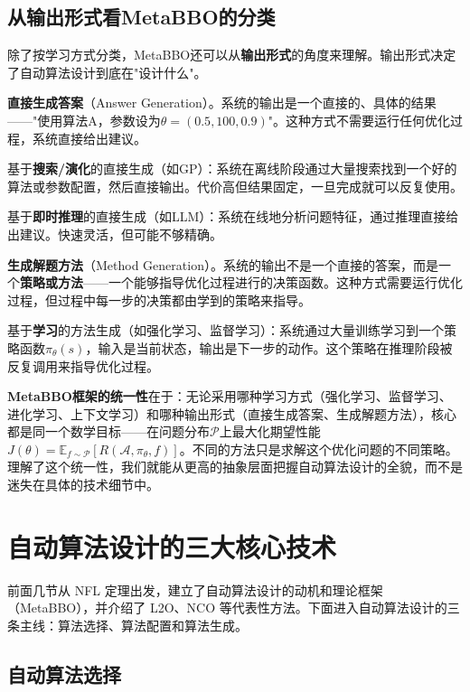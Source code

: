 \documentclass[lang=cn,zihao=-4,a4paper,fontset=windows]{beautybook}
\begin{document}
\subsection{从输出形式看MetaBBO的分类}

除了按学习方式分类，MetaBBO还可以从\textbf{输出形式}的角度来理解。输出形式决定了自动算法设计到底在"设计什么"。

\textbf{直接生成答案}（Answer Generation）。系统的输出是一个直接的、具体的结果——"使用算法A，参数设为$\theta = (0.5, 100, 0.9)$"。这种方式不需要运行任何优化过程，系统直接给出建议。

基于\textbf{搜索/演化}的直接生成（如GP）：系统在离线阶段通过大量搜索找到一个好的算法或参数配置，然后直接输出。代价高但结果固定，一旦完成就可以反复使用。

基于\textbf{即时推理}的直接生成（如LLM）：系统在线地分析问题特征，通过推理直接给出建议。快速灵活，但可能不够精确。

\textbf{生成解题方法}（Method Generation）。系统的输出不是一个直接的答案，而是一个\textbf{策略或方法}——一个能够指导优化过程进行的决策函数。这种方式需要运行优化过程，但过程中每一步的决策都由学到的策略来指导。

基于\textbf{学习}的方法生成（如强化学习、监督学习）：系统通过大量训练学习到一个策略函数$\pi_\theta(s)$，输入是当前状态，输出是下一步的动作。这个策略在推理阶段被反复调用来指导优化过程。

\begin{fancybox}
\textbf{MetaBBO框架的统一性}在于：无论采用哪种学习方式（强化学习、监督学习、进化学习、上下文学习）和哪种输出形式（直接生成答案、生成解题方法），核心都是同一个数学目标——在问题分布$\mathcal{P}$上最大化期望性能$J(\theta) = \mathbb{E}_{f \sim \mathcal{P}}[R(\mathcal{A}, \pi_\theta, f)]$。不同的方法只是求解这个优化问题的不同策略。理解了这个统一性，我们就能从更高的抽象层面把握自动算法设计的全貌，而不是迷失在具体的技术细节中。
\end{fancybox}

\section{自动算法设计的三大核心技术}

前面几节从 NFL 定理出发，建立了自动算法设计的动机和理论框架（MetaBBO），并介绍了 L2O、NCO 等代表性方法。下面进入自动算法设计的三条主线：算法选择、算法配置和算法生成。

\subsection{自动算法选择}
\end{document}
